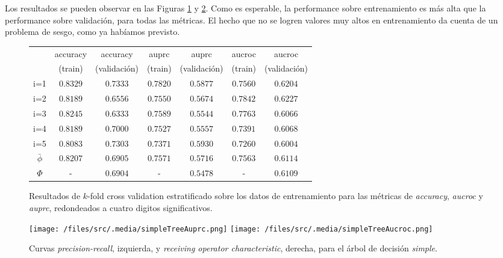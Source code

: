 Los resultados se pueden observar en las Figuras \ref{metricas_simple} y \ref{curvas_simple}. Como es esperable, la performance sobre entrenamiento es más alta que la performance sobre validación, para todas las métricas. El hecho que no se logren valores muy altos en entrenamiento da cuenta de un problema de sesgo, como ya habíamos previsto. 

\vspace{0.5em}
\begin{figure}[!htbp]
\begin{center}
\begin{tabular}{ |c|c|c|c|c|c|c| } 
\hline
            & accuracy  & accuracy      & auprc     & auprc         & aucroc   & aucroc      \\
            & (train)   & (validación)  & (train)   & (validación)  & (train)   & (validación) \\      
\hline
i=1         & $0.8329$  & $0.7333$      & $0.7820$  & $0.5877$      & $0.7560$  & $0.6204$ \\
i=2         & $0.8189$  & $0.6556$      & $0.7550$  & $0.5674$      & $0.7842$  & $0.6227$ \\
i=3         & $0.8245$  & $0.6333$      & $0.7589$  & $0.5544$      & $0.7763$  & $0.6066$ \\
i=4         & $0.8189$  & $0.7000$      & $0.7527$  & $0.5557$      & $0.7391$  & $0.6068$ \\
i=5         & $0.8083$  & $0.7303$      & $0.7371$  & $0.5930$      & $0.7260$  & $0.6004$ \\
$\bar\phi$  & $0.8207$  & $0.6905$      & $0.7571$  & $0.5716$      & $0.7563$  & $0.6114$ \\
$\Phi$      & -         & $0.6904$      & -         & $0.5478$      & -         & $0.6109$ \\
\hline
\end{tabular}
\end{center}
\caption{Resultados de $k$-fold cross validation estratificado sobre los datos de entrenamiento para las métricas de \textit{accuracy}, \textit{aucroc} y \textit{auprc}, redondeados a cuatro digitos significativos.}\label{metricas_simple}
\end{figure}

\begin{figure}[!htbp]
    \centering 
    \texttt{[image: /files/src/.media/simpleTreeAuprc.png]}
    \texttt{[image: /files/src/.media/simpleTreeAucroc.png]}
    \caption{Curvas \textit{precision-recall}, izquierda, y \textit{receiving operator characteristic}, derecha, para el árbol de decisión \textit{simple}.}
    \label{curvas_simple}
\end{figure}

